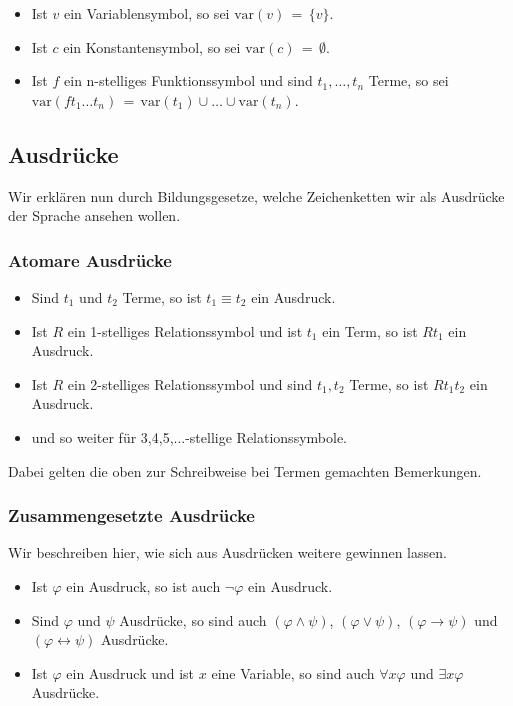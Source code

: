 \begin{itemize}
	\item Ist $v$ ein Variablensymbol, so sei $\mathrm{var}(v) \,=\, \{v\}$.
	\item Ist $c$ ein Konstantensymbol, so sei $\mathrm{var}(c) \,=\, \emptyset$.
	\item Ist $f$ ein n-stelliges Funktionssymbol und sind $t_1,\ldots,t_n$ Terme, so sei $\mathrm{var}(ft_1\ldots t_n) \,=\, \mathrm{var}(t_1)\cup\ldots \cup \mathrm{var}(t_n)$.
\end{itemize}


\subsection{Ausdrücke}
Wir erklären nun durch Bildungsgesetze, welche Zeichenketten wir als Ausdrücke der Sprache ansehen wollen.

\subsubsection{Atomare Ausdrücke}

\begin{itemize}
	\item Sind $t_1$ und $t_2$ Terme, so ist $t_1 \equiv t_2$ ein Ausdruck.
	\item Ist $R$ ein 1-stelliges Relationssymbol und ist $t_1$ ein Term, so ist $Rt_1$ ein Ausdruck.
	\item Ist $R$ ein 2-stelliges Relationssymbol und sind $t_1,t_2$ Terme, so ist $Rt_1t_2$ ein Ausdruck.
	\item und so weiter für 3,4,5,...-stellige Relationssymbole.
\end{itemize}

Dabei gelten die oben zur Schreibweise bei Termen gemachten Bemerkungen.

\subsubsection{Zusammengesetzte Ausdrücke}

Wir beschreiben hier, wie sich aus Ausdrücken weitere gewinnen lassen.

\begin{itemize}
	\item Ist $\varphi$ ein Ausdruck, so ist auch $\neg \varphi$ ein Ausdruck.
	\item Sind $\varphi$ und $\psi$ Ausdrücke, so sind auch $(\varphi \land \psi)$, $(\varphi \lor \psi)$, $(\varphi \rightarrow \psi)$ und $(\varphi \leftrightarrow \psi)$ Ausdrücke.
	\item Ist $\varphi$ ein Ausdruck und ist $x$ eine Variable, so sind auch $\forall x \varphi$ und $\exists x \varphi$ Ausdrücke.
\end{itemize}

